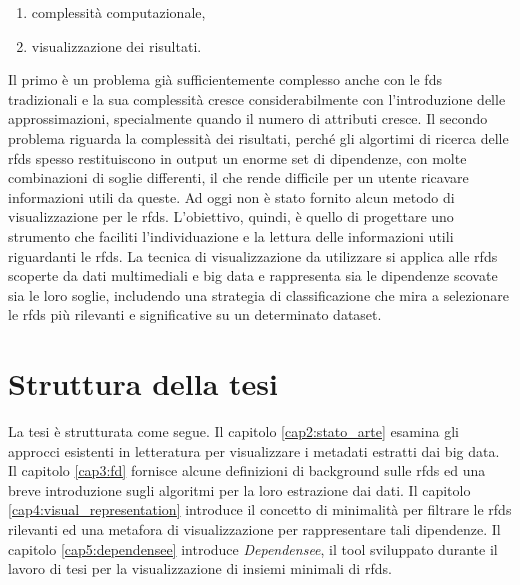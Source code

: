 \begin{enumerate}
    \item complessit\`{a} computazionale,
    \item visualizzazione dei risultati.
\end{enumerate}
Il primo \`{e} un problema gi\`{a} sufficientemente complesso anche con le \acrlong{fds} tradizionali e la sua complessit\`{a} cresce considerabilmente con l'introduzione delle approssimazioni, specialmente quando il numero di attributi cresce. Il secondo problema riguarda la complessit\`{a} dei risultati, perch\'{e} gli algortimi di ricerca delle \acrlong{rfds} spesso restituiscono in output un enorme set di dipendenze, con molte combinazioni di soglie differenti, il che rende difficile per un utente ricavare informazioni utili da queste. Ad oggi non \`{e} stato fornito alcun metodo di visualizzazione per le \acrlong{rfds}. L'obiettivo, quindi, \`{e} quello di progettare uno strumento che faciliti l'individuazione e la lettura delle informazioni utili riguardanti le \acrlong{rfds}. La tecnica di visualizzazione da utilizzare si applica alle \acrlong{rfds} scoperte da dati multimediali e big data e rappresenta sia le dipendenze scovate sia le loro soglie, includendo una strategia di classificazione che mira a selezionare le \acrlong{rfds} pi\`{u} rilevanti e significative su un determinato dataset.

\section{Struttura della tesi}
La tesi \`{e} strutturata come segue. Il capitolo \ref{cap2:stato_arte} esamina gli approcci esistenti in letteratura per visualizzare i metadati estratti dai big data. Il capitolo \ref{cap3:fd} fornisce alcune definizioni di background sulle \acrlong{rfds} ed una breve introduzione sugli algoritmi per la loro estrazione dai dati. Il capitolo \ref{cap4:visual_representation} introduce il concetto di minimalit\`{a} per filtrare le \acrlong{rfds} rilevanti ed una metafora di visualizzazione per rappresentare tali dipendenze. Il capitolo \ref{cap5:dependensee} introduce \textit{Dependensee}, il tool sviluppato durante il lavoro di tesi per la visualizzazione di insiemi minimali di \acrlong{rfds}.